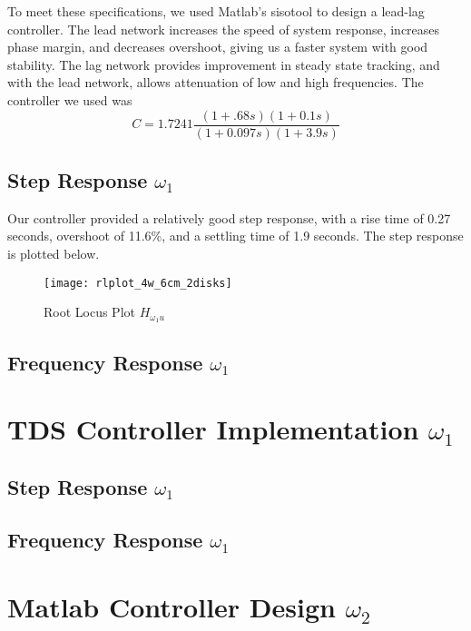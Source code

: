\documentclass[11pt,titlepage]{article}
\begin{document}
		To meet these specifications, we used Matlab's sisotool to design a lead-lag controller. The lead network increases the speed of system response, increases phase margin, and decreases overshoot, giving us a faster system with good stability. The lag network provides improvement in steady state tracking, and with the lead network, allows attenuation of low and high frequencies. The controller we used was 
		\begin{equation*}
		C = 1.7241\frac{(1+ .68s)(1+0.1s)}{(1+0.097s)(1+3.9s)}
		\end{equation*}

	\subsection{Step Response $\omega_1$}
		Our controller provided a relatively good step response, with a rise time of  0.27 seconds, overshoot of 11.6\%, and a settling time of 1.9 seconds. The step response is plotted below.
		
	\begin{figure}[H]
        \centering
        \texttt{[image: rlplot\_4w\_6cm\_2disks]}
        \caption{Root Locus Plot $H_{\omega_{1}u}$}
        \label{fig:disc_sys}
    \end{figure}
		
	\subsection{Frequency Response $\omega_1$}

\section{TDS Controller Implementation $\omega_1$}

	\subsection{Step Response $\omega_1$}

	\subsection{Frequency Response $\omega_1$}

\section{Matlab Controller Design $\omega_2$}
	
\end{document}
